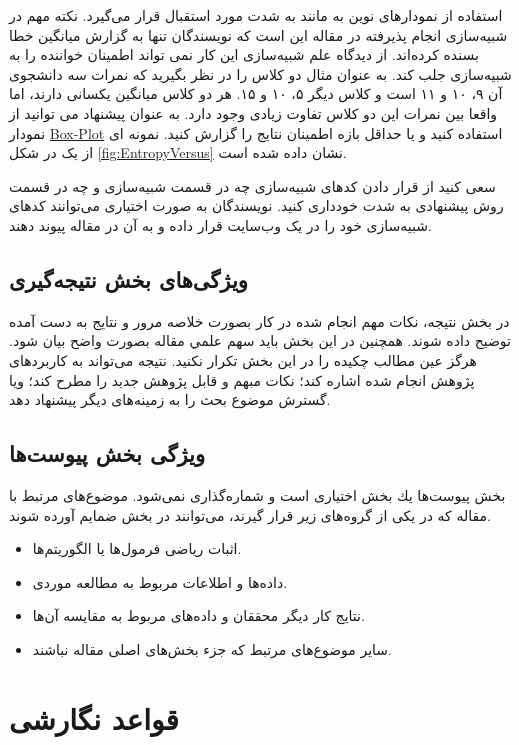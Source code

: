 \documentclass{CSICC2020}
\begin{document}
استفاده از نمودارهای نوین به مانند  به شدت مورد استقبال قرار می‌گیرد. نکته مهم در شبیه‌سازی
انجام پذیرفته در مقاله این است که نویسندگان تنها به گزارش میانگین خطا بسنده کرده‌اند. از دیدگاه علم شبیه‌سازی این کار نمی تواند اطمینان خواننده را به شبیه‌سازی جلب کند. به عنوان مثال دو کلاس را در نظر بگیرید که نمرات سه دانشجوی آن ۹، ۱۰ و ۱۱ است و کلاس دیگر ۵، ۱۰ و ۱۵. هر دو کلاس میانگین یکسانی دارند، اما واقعا بین نمرات این دو کلاس تفاوت زیادی وجود دارد. به عنوان پیشنهاد می توانید از نمودار
\href{https://en.wikipedia.org/wiki/Box_plot}{Box-Plot}
استفاده کنید و یا حداقل بازه اطمینان نتایج را گزارش کنید. نمونه ای از یک  در شکل
\ref{fig:EntropyVersus}
نشان داده شده است. 

سعی کنید از قرار دادن کدهای شبیه‌سازی چه در قسمت شبیه‌سازی و چه در قسمت روش پیشنهادی به شدت خودداری کنید. نویسندگان به صورت اختیاری می‌توانند کدهای شبیه‌سازی خود را در یک وب‌سایت قرار داده و به آن در مقاله پیوند دهند. 

\subsection{ویژگی‌های بخش نتیجه‌گیری}
در بخش نتيجه، نكات مهم انجام شده در كار بصورت خلاصه مرور و نتايج به دست آمده توضيح داده شوند. همچنين در اين بخش بايد سهم علمي مقاله بصورت واضح بيان شود. هرگز عين مطالب چكيده را در اين بخش تكرار نكنيد. نتيجه می‏‌تواند به کاربردهای پژوهش انجام شده اشاره کند؛ نکات مبهم و قابل پژوهش جديد را مطرح کند؛ ويا گسترش موضوع بحث را به زمينه‏‌های ديگر پيشنهاد دهد.

\subsection{ویژگی بخش پیوست‌ها}
بخش پیوست‌ها یك بخش اختیاری است و شماره‌گذاری  نمی‌شود. موضوع‌های مرتبط با مقاله كه در یكی از گروه‌های زیر قرار گیرند، می‌توانند در بخش ضمایم آورده شوند.
\begin{itemize}
\item
اثبات ریاضی فرمول‌ها یا الگوریتم‌ها.
\item
داده‌ها و اطلاعات مربوط به مطالعه موردی.
\item
نتایج كار دیگر محققان و داده‌های مربوط به مقایسه آن‌ها.
\item
سایر موضوع‌های مرتبط كه جزء بخش‌های اصلی مقاله نباشند.
\end{itemize}


\section{قواعد نگارشی}
\end{document}
